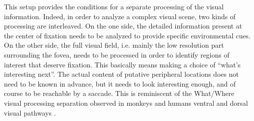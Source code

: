 This setup provides the conditions for a separate processing of the visual information.
Indeed, in order to analyze a complex visual scene, two kinds of processing are interleaved. On the one side, the detailed information present at the center of fixation needs to be analyzed to provide specific environmental cues.
On the other side, the full visual field, i.e. mainly the low resolution part surrounding the fovea, needs to be processed in order to identify regions of interest that deserve fixation. This basically means making a choice of “what’s interesting next”. The actual content of putative peripheral locations does not need to be known in advance, but it needs to look interesting enough, and of course to be reachable by a saccade. This is reminiscent of the What/Where visual processing separation observed in monkeys and humans ventral and dorsal visual pathways \cite{mishkin1983object}.

